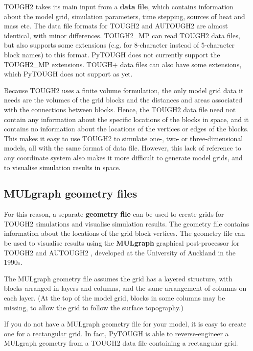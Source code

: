 TOUGH2 takes its main input from a \textbf{data file}, which contains information about the model grid, simulation parameters, time stepping, sources of heat and mass etc.  The data file formats for TOUGH2 and AUTOUGH2 are almost identical, with minor differences.  TOUGH2\_MP can read TOUGH2 data files, but also supports some extensions (e.g. for 8-character instead of 5-character block names) to this format.  PyTOUGH does not currently support the TOUGH2\_MP extensions.  TOUGH+ data files can also have some extensions, which PyTOUGH does not support as yet.

Because TOUGH2 uses a finite volume formulation, the only model grid data it needs are the volumes of the grid blocks and the distances and areas associated with the connections between blocks.  Hence, the TOUGH2 data file need not contain any information about the specific locations of the blocks in space, and it contains no information about the locations of the vertices or edges of the blocks.  This makes it easy to use TOUGH2 to simulate one-, two- or three-dimensional models, all with the same format of data file.  However, this lack of reference to any coordinate system also makes it more difficult to generate model grids, and to visualise simulation results in space.

\subsection{MULgraph geometry files}

For this reason, a separate \textbf{geometry file} can be used to create grids for TOUGH2 simulations and visualise simulation results.  The geometry file contains information about the locations of the grid block vertices.  The geometry file can be used to visualise results using the \textbf{MULgraph} graphical post-processor for TOUGH2 and AUTOUGH2 \citep{mulgraph}, developed at the University of Auckland in the 1990s.

The MULgraph geometry file assumes the grid has a layered structure, with blocks arranged in layers and columns, and the same arrangement of columns on each layer.  (At the top of the model grid, blocks in some columns may be missing, to allow the grid to follow the surface topography.)

If you do not have a MULgraph geometry file for your model, it is easy to create one for a \hyperref[sec:mulgrid:rectangular]{rectangular} grid. In fact, PyTOUGH is able to \hyperref[sec:t2grid:rectgeo]{reverse-engineer} a MULgraph geometry from a TOUGH2 data file containing a rectangular grid.

